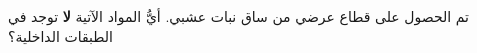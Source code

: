 \begin{question}\begin{instance}  \begin{mcq}[standalone=false]    \begin{stem}      تم الحصول على قطاع عرضي من ساق نبات عشبي. أيُّ المواد الآتية \textbf{ لا } توجد في الطبقات الداخلية؟\par    \end{stem}    \begin{distractors}        \end{distractors}              \end{mcq}\end{instance}\end{question}